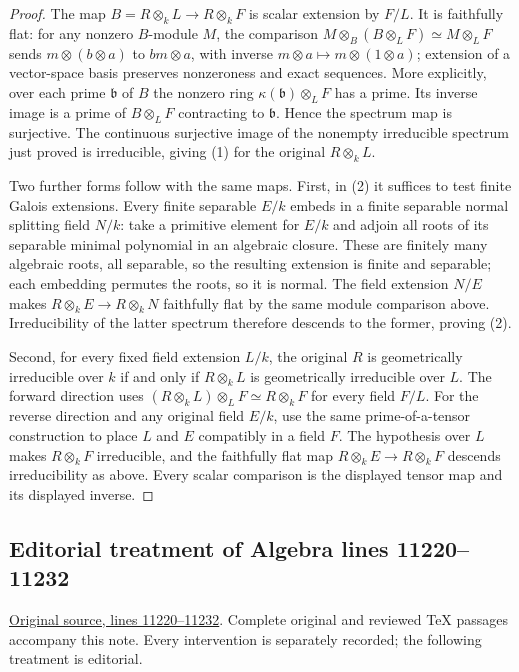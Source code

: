 \begin{proof}
The map $B=R\otimes_k L\to R\otimes_k F$
is scalar extension by $F/L$.
It is faithfully flat: for any
nonzero $B$-module $M$, the
comparison
$M\otimes_B(B\otimes_L F)\simeq M\otimes_L F$
sends $m\otimes(b\otimes a)$ to
$bm\otimes a$, with inverse
$m\otimes a\mapsto m\otimes(1\otimes a)$;
extension of a vector-space
basis preserves nonzeroness
and exact sequences. More
explicitly, over each prime
$\mathfrak b$ of $B$ the
nonzero ring $\kappa(\mathfrak b)\otimes_L F$
has a prime. Its inverse image
is a prime of $B\otimes_L F$
contracting to $\mathfrak b$.
Hence the spectrum map is
surjective. The continuous
surjective image of the
nonempty irreducible spectrum
just proved is irreducible,
giving (1) for the original
$R\otimes_k L$.

Two further forms follow with
the same maps. First, in (2)
it suffices to test finite
Galois extensions. Every finite
separable $E/k$ embeds in a
finite separable normal splitting
field $N/k$: take a primitive
element for $E/k$ and adjoin
all roots of its separable
minimal polynomial in an
algebraic closure. These are
finitely many algebraic roots,
all separable, so the resulting
extension is finite and
separable; each embedding
permutes the roots, so it is
normal. The field extension
$N/E$ makes
$R\otimes_k E\to R\otimes_k N$
faithfully flat by the same
module comparison above.
Irreducibility of the latter
spectrum therefore descends
to the former, proving (2).

Second, for every fixed field
extension $L/k$, the original
$R$ is geometrically irreducible
over $k$ if and only if
$R\otimes_k L$ is geometrically
irreducible over $L$.
The forward direction uses
$(R\otimes_k L)\otimes_L F\simeq R\otimes_k F$
for every field $F/L$.
For the reverse direction and
any original field $E/k$, use
the same prime-of-a-tensor
construction to place $L$ and
$E$ compatibly in a field $F$.
The hypothesis over $L$ makes
$R\otimes_k F$ irreducible,
and the faithfully flat map
$R\otimes_k E\to R\otimes_k F$
descends irreducibility as
above. Every scalar comparison
is the displayed tensor map
and its displayed inverse.
\end{proof}


\subsection{Editorial treatment of Algebra lines 11220--11232}

\hypertarget{algebra-context-139}{}

\noindent\href{https://github.com/stacks/stacks-project/blob/a04446e57ec1fbc252a871afcec7752fb2807b14/algebra.tex\#L11220}{Original source, lines 11220--11232}. Complete original and reviewed TeX passages accompany this note. Every intervention is separately recorded; the following treatment is editorial.


